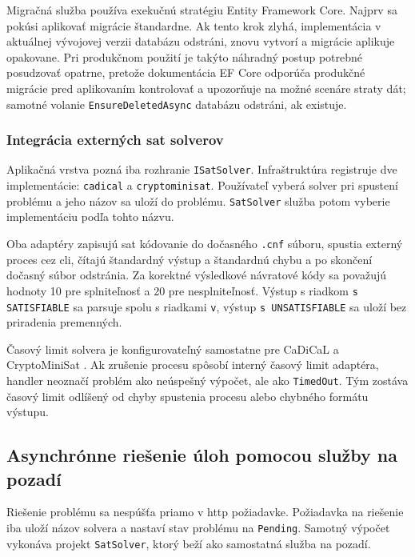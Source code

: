 Migračná služba používa exekučnú stratégiu Entity Framework Core. Najprv sa pokúsi aplikovať migrácie štandardne. Ak tento krok zlyhá, implementácia v aktuálnej vývojovej verzii databázu odstráni, znovu vytvorí a migrácie aplikuje opakovane. Pri produkčnom použití je takýto náhradný postup potrebné posudzovať opatrne, pretože dokumentácia EF Core odporúča produkčné migrácie pred aplikovaním kontrolovať a upozorňuje na možné scenáre straty dát; samotné volanie \texttt{EnsureDeletedAsync} databázu odstráni, ak existuje.

\subsubsection{Integrácia externých \acrshort{sat} solverov}\label{sec:implementation:sat-solver-integration}
Aplikačná vrstva pozná iba rozhranie \texttt{ISatSolver}. Infraštruktúra registruje dve implementácie: \texttt{cadical} a \texttt{cryptominisat}. Používateľ vyberá solver pri spustení problému a jeho názov sa uloží do problému. \texttt{SatSolver} služba potom vyberie implementáciu podľa tohto názvu.

Oba adaptéry zapisujú \acrshort{sat} kódovanie do dočasného \texttt{.cnf} súboru, spustia externý proces cez \acrfull{cli}, čítajú štandardný výstup a štandardnú chybu a po skončení dočasný súbor odstránia. Za korektné výsledkové návratové kódy sa považujú hodnoty 10 pre splniteľnosť a 20 pre nesplniteľnosť. Výstup s riadkom \texttt{s SATISFIABLE} sa parsuje spolu s riadkami \texttt{v}, výstup \texttt{s UNSATISFIABLE} sa uloží bez priradenia premenných.

Časový limit solvera je konfigurovateľný samostatne pre CaDiCaL \cite{10.1007/978-3-031-65627-9_7} a CryptoMiniSat \cite{DBLP:conf/sat/SoosNC09}. Ak zrušenie procesu spôsobí interný časový limit adaptéra, handler neoznačí problém ako neúspešný výpočet, ale ako \texttt{TimedOut}. Tým zostáva časový limit odlíšený od chyby spustenia procesu alebo chybného formátu výstupu.

\subsection{Asynchrónne riešenie úloh pomocou služby na pozadí}\label{sec:implementation:async-solving}
Riešenie problému sa nespúšťa priamo v \acrshort{http} požiadavke. Požiadavka na riešenie iba uloží názov solvera a nastaví stav problému na \texttt{Pending}. Samotný výpočet vykonáva projekt \texttt{SatSolver}, ktorý beží ako samostatná služba na pozadí.

